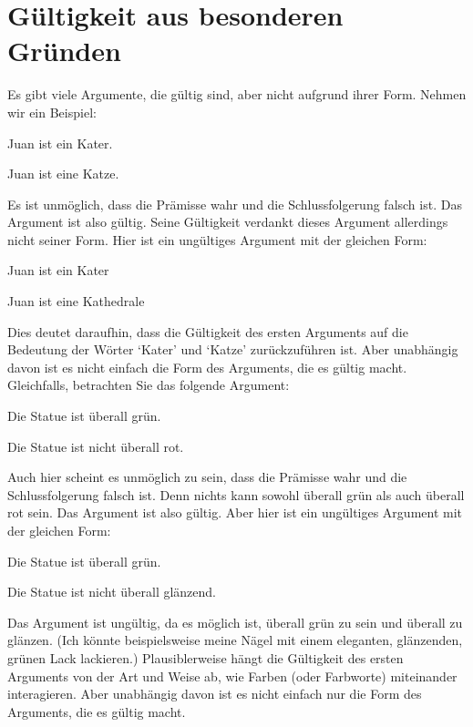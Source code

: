 \section{Gültigkeit aus besonderen Gründen}
Es gibt viele Argumente, die gültig sind, aber nicht aufgrund ihrer Form. Nehmen wir ein Beispiel:
	\begin{earg}
		\item[] Juan ist ein Kater.
		\item[\therefore] Juan ist eine Katze.
	\end{earg}
Es ist unmöglich, dass die Prämisse wahr und die Schlussfolgerung falsch ist. Das Argument ist also gültig. Seine Gültigkeit verdankt dieses Argument allerdings nicht seiner Form. Hier ist ein ungültiges Argument mit der gleichen Form:
	\begin{earg}
		\item[] Juan ist ein Kater
		\item[\therefore] Juan ist eine Kathedrale
	\end{earg}
Dies deutet daraufhin, dass die Gültigkeit des ersten Arguments auf die Bedeutung der Wörter `Kater' und `Katze' zurückzuführen ist. Aber unabhängig davon ist es nicht einfach die Form des Arguments, die es gültig macht. Gleichfalls, betrachten Sie das folgende Argument: %
	\begin{earg}
		\item[] Die Statue ist überall grün.
		\item[\therefore] Die Statue ist nicht überall rot.
	\end{earg}
Auch hier scheint es unmöglich zu sein, dass die Prämisse wahr und die Schlussfolgerung falsch ist. Denn nichts kann sowohl überall grün als auch überall rot sein. Das Argument ist also gültig. Aber hier ist ein ungültiges Argument mit der gleichen Form:
	\begin{earg}
		\item[] Die Statue ist überall grün.
		\item[\therefore] Die Statue  ist nicht überall glänzend.
	\end{earg}
Das Argument ist ungültig, da es möglich ist, überall grün zu sein und überall zu glänzen. (Ich könnte beispielsweise meine Nägel mit einem eleganten, glänzenden, grünen Lack lackieren.) Plausiblerweise hängt die Gültigkeit des ersten Arguments von der Art und Weise ab, wie Farben (oder Farbworte) miteinander interagieren. Aber unabhängig davon ist es nicht einfach nur die Form des Arguments, die es gültig macht.

